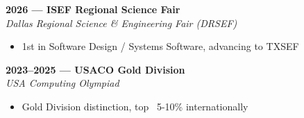 \documentclass[11pt]{article}
\begin{document}
    \vspace{0.25em}
    \textbf{2026 --- ISEF Regional Science Fair} \\
    \textit{Dallas Regional Science \& Engineering Fair (DRSEF)}
    \vspace{-0.5em}
    \begin{itemize}
        \item 1st in Software Design / Systems Software, advancing to TXSEF
    \end{itemize}

    \vspace{0.25em}
    \textbf{2023--2025 --- USACO Gold Division} \\
    \textit{USA Computing Olympiad}
    \vspace{-0.5em}
    \begin{itemize}
        \item Gold Division distinction, top ~5-10\% internationally
    \end{itemize}
\end{document}
